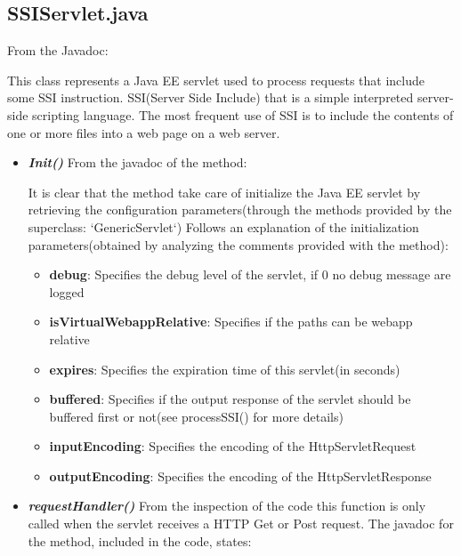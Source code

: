 \documentclass[11pt,titlepage]{article} %
\begin{document}
\subsection{SSIServlet.java}

  From the Javadoc:
  
  

  \noindent This class represents a Java EE servlet used to process requests that include some SSI instruction.\newline
  SSI(Server Side Include) that is a simple interpreted server-side scripting language.
  The most frequent use of SSI is to include the contents of one or more files into a web page on a web server.

  \begin{itemize}
    \item \textbf{\textit{Init()}}
      \newline From the javadoc of the method:
      
      It is clear that the method take care of initialize the Java EE servlet by retrieving the configuration
      parameters(through the methods provided by the superclass: `GenericServlet`)\newline
      Follows an explanation of the initialization parameters(obtained by analyzing the comments provided with the method):
      \begin{itemize}
       \item \textbf{debug}:
	Specifies the debug level of the servlet, if 0 no debug message are logged
       \item \textbf{isVirtualWebappRelative}:
	Specifies if the paths can be webapp relative
       \item \textbf{expires}:
	Specifies the expiration time of this servlet(in seconds)
       \item \textbf{buffered}:
	Specifies if the output response of the servlet should be buffered first or not(see processSSI() for more details)
       \item \textbf{inputEncoding}:
	Specifies the encoding of the HttpServletRequest
       \item \textbf{outputEncoding}:
	Specifies the encoding of the HttpServletResponse
      \end{itemize}

      

    \item \textbf{\textit{requestHandler()}}
      \newline From the inspection of the code this function is only called when the servlet receives a HTTP Get or Post request.
      The javadoc for the method, included in the code, states:
      

\end{itemize}
\end{document}
